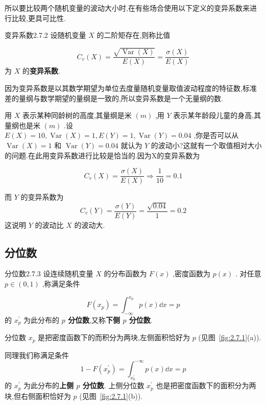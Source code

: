 所以要比较两个随机变量的波动大小时,在有些场合使用以下定义的变异系数来进行比较,更具可比性.

\begin{definition}{变异系数}{2.7.2}
	设随机变量 $ X $ 的二阶矩存在,则称比值
	
	\begin{equation}
	C_{v}(X)=\frac{\sqrt{\operatorname{Var}(X)}}{E(X)}=\frac{\sigma(X)}{E(X)} \label{eq:2.7.3}
	\end{equation}
	为 $ X $ 的\textbf{变异系数}.
\end{definition}

因为变异系数是以其数学期望为单位去度量随机变量取值波动程度的特征数,标准差的量纲与数学期望的量纲是一致的,所以变异系数是一个无量纲的数.

\begin{example}\label{exam:2.7.2}
	用 $ X $ 表示某种同龄树的高度,其量纲是米 $ (m) $ ,用 $ Y $ 表示某年龄段儿童的身高,其量纲也是米 $ (m) $ .设 $ E(X)=10, \operatorname{Var}(X)=1, E(Y)=1, \operatorname{Var}(Y)=0.04 $ ,你是否可以从 $ \operatorname{Var}(X)=1 $ 和 $ \operatorname{Var}(Y)=0.04 $ 就认为 $ Y $ 的波动小?这就有一个取值相对大小的问题.在此用变异系数进行比较是恰当的.因为X的变异系数为
	
	\[
	C_{v}(X)=\frac{\sigma(X)}{E(X)} \Rightarrow \frac{1}{10}=0.1
	\]
	
	而 $ Y $ 的变异系数为
	\[
	C_{v}(Y)=\frac{\sigma(Y)}{E(Y)}=\frac{\sqrt{0.04}}{1}=0.2
	\]
	这说明 $ Y $ 的波动比 $ X $ 的波动大.
\end{example}

\subsection{分位数}\label{ssec:2.7.3}

\begin{definition}{分位数}{2.7.3}
	设连续随机变量 $ X $ 的分布函数为 $ F(x) $ ,密度函数为 $ p(x) $ .
	对任意 $ p \in(0,1) $ ,称满足条件
	
	\begin{equation}
	F\left(x_{p}\right)=\int_{-\infty}^{x_{p}} p(x) \dd x=p \label{eq:2.7.4}
	\end{equation}
	的 $ x_{p}^{\prime} $ 为此分布的 \textbf{ $ p $ 分位数},又称\textbf{下侧 $ p $ 分位数}.
	
	分位数 $ x_{p} $ 是把密度函数下的而积分为两块,左侧面积恰好为 $ p $ (见图~\ref{fig:2.7.1}(a)).
	
	同理我们称满足条件
	\begin{equation}
	1-F\left(x_{p}^{\prime}\right)=\int_{x_{0}^{\prime}}^{-\infty} p(x) \dd x=p \label{eq:2.7.5}
	\end{equation}
	的 $ x_{p}^{\prime} $ 为此分布的\textbf{上侧 $ p $ 分位数}.
	上侧分位数 $ x_{p}^{\prime} $ 也是把密度函数下的面积分为两块,但右侧面积恰好为 $ p $ (见图~\ref{fig:2.7.1}(b)).
\end{definition}

